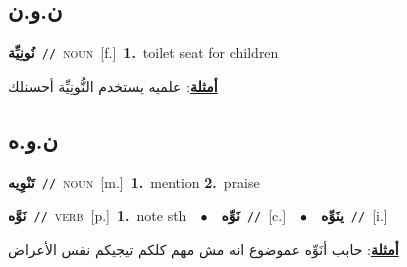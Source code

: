\documentclass[10pt,a4paper,twoside]{article} %
\begin{document}
\begin{multicols}{2}
\vspace{-3mm}
\subsection*{\color{blue}\foreignlanguage{arabic}{ن.و.ن}\color{blue}{}} 

{\setlength\topsep{0pt}\textbf{\foreignlanguage{arabic}{نُونِيِّة}}\ {\color{gray}\texttt{//}\color{black}}\ \textsc{noun}\ [f.]\ \textbf{1.}~toilet seat for children\  \begin{flushright}\color{gray}\foreignlanguage{arabic}{\textbf{\underline{\foreignlanguage{arabic}{أمثلة}}}: علميه يستخدم النُّونِيِّة أحسنلك}\end{flushright}\color{black}} \vspace{2mm}

\vspace{-3mm}
\subsection*{\color{blue}\foreignlanguage{arabic}{ن.و.ه}\color{blue}{}} 

{\setlength\topsep{0pt}\textbf{\foreignlanguage{arabic}{تَنْوِيه}}\ {\color{gray}\texttt{//}\color{black}}\ \textsc{noun}\ [m.]\ \textbf{1.}~mention  \textbf{2.}~praise\ } \vspace{2mm}

{\setlength\topsep{0pt}\textbf{\foreignlanguage{arabic}{نَوَّه}}\ {\color{gray}\texttt{//}\color{black}}\ \textsc{verb}\ [p.]\ \textbf{1.}~note sth\ \ $\bullet$\ \ \setlength\topsep{0pt}\textbf{\foreignlanguage{arabic}{نَوِّه}}\ {\color{gray}\texttt{//}\color{black}}\ [c.]\ \ $\bullet$\ \ \setlength\topsep{0pt}\textbf{\foreignlanguage{arabic}{ينَوِّه}}\ {\color{gray}\texttt{//}\color{black}}\ [i.]\  \begin{flushright}\color{gray}\foreignlanguage{arabic}{\textbf{\underline{\foreignlanguage{arabic}{أمثلة}}}: حابب أنَوِّه عموضوع انه مش مهم كلكم تيجيكم نفس الأعراض}\end{flushright}\color{black}} \vspace{2mm}


\end{multicols}
\end{document}
